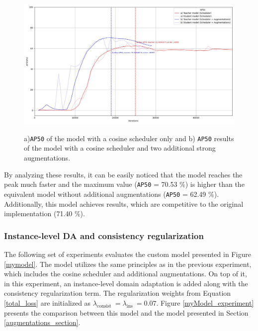 \begin{figure}[htb]
	\begin{center}
		\includegraphics[width=14cm]{./AP50_augmentation.jpg}
	\end{center}
	\caption{a)\texttt{AP50} of the model with a cosine scheduler only and b) \texttt{AP50} results of the model with a cosine scheduler and two additional strong augmentations.}
	\begin{center}
		\label{augmentation_experiment}
	\end{center}
\end{figure}

By analyzing these results, it can be easily noticed that the model reaches the peak much faster and the maximum value (\texttt{AP50} = 70.53 \%) is higher than the equivalent model without additional augmentations (\texttt{AP50} = 62.49 \%). Additionally, this model achieves results, which are competitive to the original implementation (71.40 \%).

\FloatBarrier  

\subsubsection{Instance-level DA and consistency regularization}
The following set of experiments evaluates the custom model presented in Figure \ref{mymodel}. The model utilizes the same principles as in the previous experiment, which includes the cosine scheduler and additional augmentations. On top of it, in this experiment, an instance-level domain adaptation is added along with the consistency regularization term. The regularization weights from Equation \ref{total_loss} are initialized as $\lambda_{\text {consist }} = \lambda_{\text {ins }} = 0.07$. Figure \ref{myModel_experiment} presents the comparison between this model and the model presented in Section \ref{augmentations_section}.

